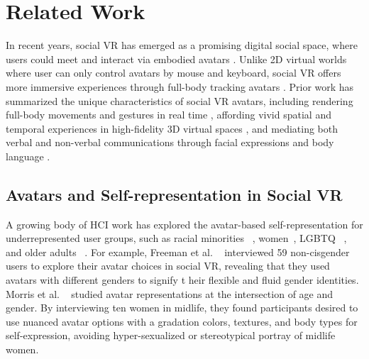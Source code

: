 \section{Related Work}

In recent years, social VR has emerged as a promising digital social space, where users could meet and interact via embodied avatars \cite{Tham_2018_understanding, maloney_2020_sleep}. Unlike 2D virtual worlds where user can only control avatars by mouse and keyboard, %
social VR offers more immersive experiences through full-body tracking avatars \cite{Freeman2020, Freeman2021, Zamanifard_2019_togetherness, Caserman_2019_real_time}. Prior work has summarized the unique characteristics of social VR avatars, including rendering full-body movements and gestures in real time \cite{Zamanifard_2019_togetherness, Sra_2018_your_place}, affording vivid spatial and temporal experiences in high-fidelity 3D virtual spaces \cite{McVeigh_2019_shaping, McVeigh_2018_what}, and mediating both verbal and non-verbal communications through facial expressions and body language \cite{maloney_nonverbal, Moustafa_2018_longitudinal}.

\subsection{Avatars and Self-representation in Social VR}
A growing body of HCI work has explored the avatar-based self-representation for underrepresented user groups, such as racial minorities ~\cite{VRharass2019, freeman2022disturbing, Freeman2021}, women~\cite{Morris_2023_women, Sadeh-Sharvit_2021_sexual}, LGBTQ ~\cite{freeman2022disturbing, queeractingout2022, freeman_2022_noncis}, and older adults ~\cite{Baker2021elder}. For example, Freeman et al. ~\cite{freeman_2022_noncis} interviewed 59 non-cisgender users to explore their avatar choices in social VR, revealing that they used avatars with different genders to signify t heir flexible and fluid gender identities. Morris et al. ~\cite{Morris_2023_women} studied avatar representations at the intersection of age and gender. By interviewing ten women in midlife, they found participants desired to use nuanced avatar options with a gradation colors, textures, and body types for self-expression, avoiding hyper-sexualized or stereotypical portray of midlife women. %

